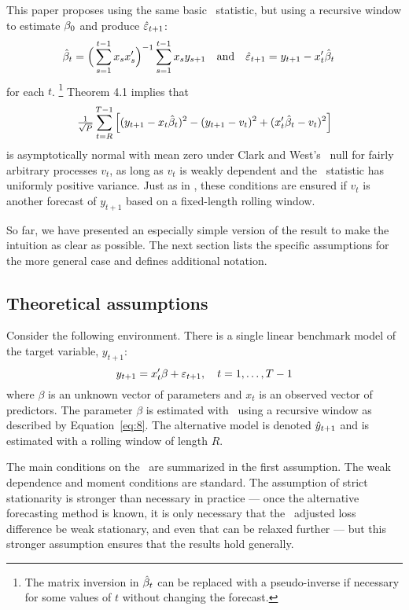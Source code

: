 \documentclass[12pt,fleqn]{article}
\begin{document}
This paper proposes using the same basic \oos\ statistic,
but using a recursive window to estimate $\btrue$ and produce
$\hat{\varepsilon}_{t+1}$:
\begin{align}
  \label{eq:8}
  \hat{\beta}_t &= \Big(\sum_{s=1}^{t-1} x_{s} x_{s}'\Big)^{-1}
  \sum_{s=1}^{t-1} x_{s} y_{s+1}
  && \text{and}
  &
  \hat{\varepsilon}_{t+1} &= y_{t+1} - x_t'\hat{\beta}_t
\end{align}
for each $t$.%
\footnote{The matrix inversion in $\hat{\beta}_t$ can be replaced with a
  pseudo-inverse if necessary for some values of $t$ without changing
  the forecast.} %
 Theorem 4.1 implies that
\begin{equation*}
  \tfrac{1}{\sqrt{P}} \sum_{t=R}^{T-1} \Big[(y_{t+1} -
  x_t\hat{\beta}_t)^2 - (y_{t+1} - v_t)^2 + (x_t'\hat{\beta}_t - v_t)^2 \Big]
\end{equation*}
is asymptotically normal with mean zero under Clark and West's
\mds\ null for fairly
arbitrary processes $v_t$, as long as $v_t$ is weakly dependent and
the \oos\ statistic has uniformly positive variance.  Just as in
\citet{ClW:06,ClW:07}, these conditions are ensured if $v_t$ is
another forecast of $y_{t+1}$ based on a fixed-length rolling window.

So far, we have presented an especially simple version of the result
to make the intuition as clear as possible. The next section lists the
specific assumptions for the more general case and defines additional notation.

\subsection{Theoretical assumptions}
\label{sec:1a}

Consider the following environment. There is a single linear
benchmark model of the target variable, $y_{t+1}$:
\begin{equation}\label{eq:1}
  y_{t+1} = x_t'\beta + \varepsilon_{t+1}, \quad t = 1,\dots,T-1
\end{equation}
where $\beta$ is an unknown vector of parameters and $x_t$ is an
observed vector of predictors. The parameter $\beta$ is estimated with
\ols\ using a recursive window as described by Equation~\eqref{eq:8}.
The alternative model is denoted $\hat{y}_{t+1}$ and is estimated with a
rolling window of length $R$.

The main conditions on the \dgp\ are summarized in the first
assumption.  The weak dependence and moment conditions are
standard. The assumption of strict stationarity is stronger than
necessary in practice --- once the alternative forecasting method is
known, it is only necessary that the \oos\ adjusted loss difference be
weak stationary, and even that can be relaxed further --- but this
stronger assumption ensures that the results hold generally.
\end{document}

